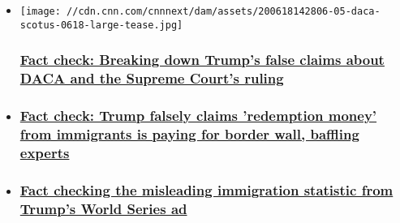 \begin{itemize}
\item
  \href{/2020/06/25/politics/fact-check-trump-daca-supreme-court-tweets/index.html}{}

  \texttt{[image: //cdn.cnn.com/cnnnext/dam/assets/200618142806-05-daca-scotus-0618-large-tease.jpg]}

  \hypertarget{fact-check-breaking-down-trumps-false-claims-about-daca-and-the-supreme-courts-ruling}{%
  \subsubsection{\texorpdfstring{\href{/2020/06/25/politics/fact-check-trump-daca-supreme-court-tweets/index.html}{Fact
  check: Breaking down Trump's false claims about DACA and the Supreme
  Court's
  ruling}}{Fact check: Breaking down Trump's false claims about DACA and the Supreme Court's ruling}}\label{fact-check-breaking-down-trumps-false-claims-about-daca-and-the-supreme-courts-ruling}}
\item
  \hypertarget{fact-check-trump-falsely-claims-redemption-money-from-immigrants-is-paying-for-border-wall-baffling-experts}{%
  \subsubsection{\texorpdfstring{\href{/2020/02/12/politics/fact-check-trump-wall-mexico-redemption/index.html}{Fact
  check: Trump falsely claims 'redemption money' from immigrants is
  paying for border wall, baffling
  experts}}{Fact check: Trump falsely claims 'redemption money' from immigrants is paying for border wall, baffling experts}}\label{fact-check-trump-falsely-claims-redemption-money-from-immigrants-is-paying-for-border-wall-baffling-experts}}
\item
  \hypertarget{fact-checking-the-misleading-immigration-statistic-from-trumps-world-series-ad-}{%
  \subsubsection{\texorpdfstring{\href{/2019/10/31/politics/trump-campaign-ad-world-series-illegal-immigration-half/index.html}{Fact
  checking the misleading immigration statistic from Trump's World
  Series ad
  }}{Fact checking the misleading immigration statistic from Trump's World Series ad }}\label{fact-checking-the-misleading-immigration-statistic-from-trumps-world-series-ad-}}
\end{itemize}


